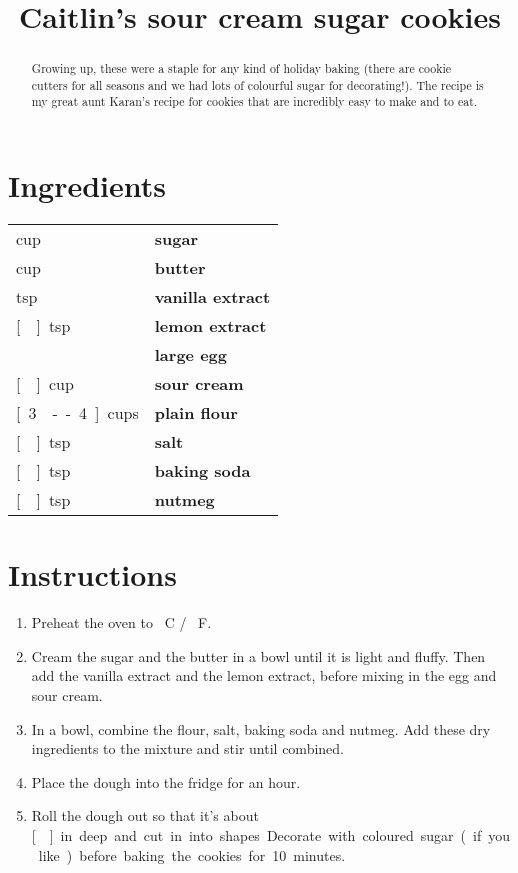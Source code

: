 \documentclass[main.tex]{subfiles}
\title{Caitlin's sour cream sugar cookies}
\begin{document}
\maketitle

\begin{abstract}
Growing up, these were a staple for any kind of holiday baking (there are cookie cutters for all seasons and we had lots of colourful sugar for decorating!). The recipe is my great aunt Karan’s recipe for cookies that are incredibly easy to make and to eat.
\end{abstract}

\section{Ingredients}

\vspace*{-\baselineskip}
\begin{table}[ht]
	\begin{tabularx}{\textwidth}{>{\hsize=0.333\hsize}X>{\bf\hsize=1\hsize}X}
	\unit[1]{cup} & sugar\\
	\unit[1]{cup} & butter\\
	\unit[1]{tsp} & vanilla extract\\
	\unit[\nicefrac{1}{4}]{tsp} & lemon extract\\
	\unit[1]{} & large egg\\
	\unit[\nicefrac{1}{4}]{cup} & sour cream\\
	\unit[3\nicefrac{1}{2}--4]{cups} & plain flour\\
	\unit[\nicefrac{1}{2}]{tsp} & salt\\
	\unit[\nicefrac{1}{2}]{tsp} & baking soda\\
	\unit[\nicefrac{1}{4}]{tsp} & nutmeg\\
	\end{tabularx}
\end{table}

\section{Instructions}

\begin{enumerate}
    \item Preheat the oven to \unit[180]{\textdegree C} / \unit[350]{\textdegree F}.
    \item Cream the sugar and the butter in a bowl until it is light and fluffy. Then add the vanilla extract and the lemon extract, before mixing in the egg and sour cream.
    \item In a bowl, combine the flour, salt, baking soda and nutmeg. Add these dry ingredients to the mixture and stir until combined.
    \item Place the dough into the fridge for an hour.
    \item Roll the dough out so that it’s about \unit[]{in} deep and cut in into shapes. Decorate with coloured sugar (if you like) before baking the cookies for 10 minutes.

\end{enumerate}
\end{document}
